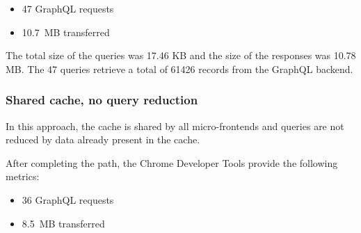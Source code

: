 \begin{itemize}
    \item 47 GraphQL requests
    \item 10.7 MB transferred
\end{itemize}

\ifshowUnusedContent



\fi

The total size of the queries was 17.46 KB and the size of the responses was 10.78 MB. The 47 queries retrieve a total of 61426 records from the GraphQL backend.

\subsubsection{Shared cache, no query reduction}

In this approach, the cache is shared by all micro-frontends and queries are not reduced by data already present in the cache.

After completing the path, the Chrome Developer Tools provide the following metrics:

\begin{itemize}
    \item 36 GraphQL requests
    \item 8.5 MB transferred
\end{itemize}

